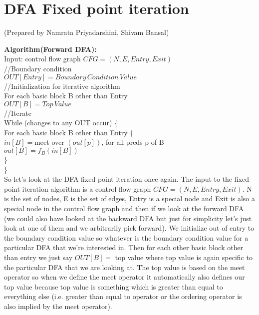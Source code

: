 \clearpage

\section{DFA Fixed point iteration}
(Prepared by Namrata Priyadarshini, Shivam Bansal)

\textbf{Algorithm(Forward DFA):} \\
Input: control flow graph $CFG = (N, E, Entry, Exit)$ \\

//Boundary condition \\
$OUT[Entry] = Boundary \, Condition \, Value$ \\

//Initialization for iterative algorithm \\
For each basic block B other than Entry \\
\hspace*{0.5cm}  $OUT[B] = Top \, Value $ \\

//Iterate \\
While (changes to any OUT occur) \{ \\
\hspace*{0.5cm}    For each basic block B other than Entry \{ \\
\hspace*{1cm}      $in[B] = $meet over $(out[p])$, for all preds p of B \\
\hspace*{1cm}      $out[B] = f_B(in[B])$ \\
\hspace*{0.5cm}    \} \\
\} \\

So let's look at the DFA fixed point iteration once again. The input to the fixed point iteration algorithm is a control flow graph $CFG = (N, E, Entry, Exit)$. N is the set of nodes, E is the set of edges, Entry is a special node and Exit is also a special node in the control flow graph and then if we look at the forward DFA (we could also have looked at the backward DFA but just for simplicity let's just look at one of them and we arbitrarily pick forward). We initialize out of entry to the boundary condition value so whatever is the boundary condition value for a particular DFA that we're interested in. Then for each other basic block other than entry we just say $OUT[B]=$ top value where top value is again specific to the particular DFA that we are looking at. The top value is based on the meet operator so when we define the meet operator it automatically also defines our top value because top value is something which is greater than equal to everything else (i.e. greater than equal to operator or the ordering operator is also implied by the meet operator). 

